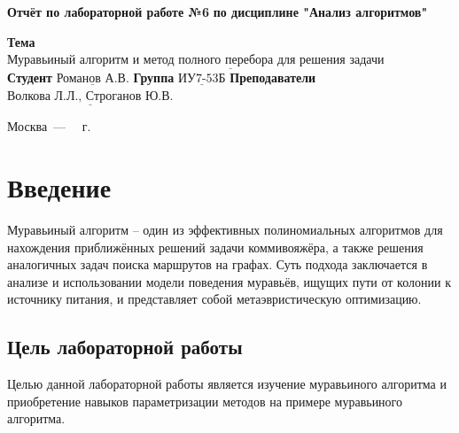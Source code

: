 \documentclass[12pt]{report}
\begin{document}
\begin{titlepage}
		
		\begin{center}
			\noindent\begin{minipage}{1.3\textwidth}\centering
				\Large\textbf{  Отчёт по лабораторной работе №6}\newline
				\textbf{по дисциплине "Анализ алгоритмов"}\newline\newline
			\end{minipage}
		\end{center}
		
		\noindent\textbf{Тема} $\underline{\text{Муравьиный алгоритм и метод полного перебора для решения задачи коммивояжёра}}$\newline
		\noindent\textbf{Студент} $\underline{\text{Романов А.В.}}$\newline
		\noindent\textbf{Группа} $\underline{\text{ИУ7-53Б}}$\newline
		\noindent\textbf{Преподаватели} $\underline{\text{Волкова Л.Л., Строганов Ю.В.}}$\newline\newline\newline\newline
		
		\begin{center}
			\vfill
			Москва~---~\the\year
			~г.
		\end{center}
	\end{titlepage}
	
	
	\tableofcontents
	
\newpage
\chapter*{Введение}
	
Муравьиный алгоритм -- один из эффективных полиномиальных алгоритмов для нахождения приближённых решений задачи коммивояжёра, а также решения аналогичных задач поиска маршрутов на графах. Суть подхода заключается в анализе и использовании модели поведения муравьёв, ищущих пути от колонии к источнику питания, и представляет собой метаэвристическую оптимизацию.
	
\section*{Цель лабораторной работы}
	
Целью данной лабораторной работы является изучение муравьиного алгоритма и приобретение навыков параметризации методов на примере муравьиного алгоритма.
	
\end{document}
